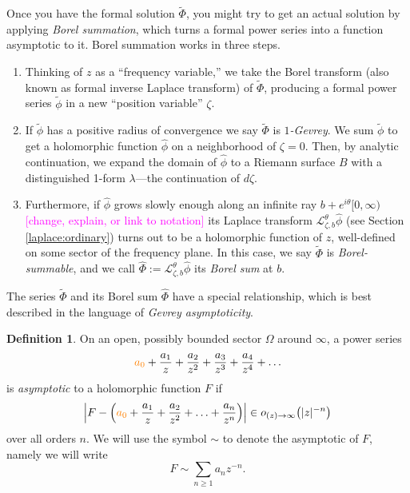 \documentclass{article}
\let\Re\relax
\DeclareMathOperator{\Re}{Re}
\newcommand{\series}[1]{\tilde{#1}}
\newcommand{\laplace}{\mathcal{L}}
\theoremstyle{definition}
\newtheorem{defn}{Definition}
\theoremstyle{plain}
\begin{document}
Once you have the formal solution $\series{\Phi}$, you might try to get an actual solution by applying {\em Borel summation}, which turns a formal power series into a function asymptotic to it. Borel summation works in three steps.
\begin{enumerate}
\item Thinking of $z$ as a ``frequency variable,'' we take the Borel transform (also known as formal inverse Laplace transform) of $\series{\Phi}$, producing a formal power series $\series{\phi}$ in a new ``position variable'' $\zeta$.
\item If $\series{\phi}$ has a positive radius of convergence we say $\series{\Phi}$ is {\em $1$-Gevrey}. We sum $\series{\phi}$ to get a holomorphic function $\hat{\phi}$ on a neighborhood of $\zeta = 0$. Then, by analytic continuation, we expand the domain of $\hat{\phi}$ to a Riemann surface $B$ with a distinguished 1-form $\lambda$---the continuation of $d\zeta$. %
\item Furthermore, if $\hat{\phi}$ grows slowly enough along an infinite ray $b + e^{i\theta}[0, \infty)$ \textcolor{magenta}{[change, explain, or link to notation]} its Laplace transform $\laplace_{\zeta,b}^\theta \hat{\phi}$ (see Section \ref{laplace:ordinary}) turns out to be a holomorphic function of $z$, well-defined on some sector of the frequency plane. In this case, we say $\tilde{\Phi}$ is {\em Borel-summable}, and we call $\hat{\Phi}:=\laplace_{\zeta,b}^\theta \hat{\phi}$ its {\em Borel sum} at $b$. 
\end{enumerate}
The series $\series{\Phi}$ and its Borel sum $\hat{\Phi}$ have a special relationship, which is best described in the language of {\em Gevrey asymptoticity}. %
\begin{defn}
On an open, possibly bounded sector $\Omega$ around $\infty$, a power series
\begin{equation}\label{series:asymp-defn}
\textcolor{orange}{a_0}+\frac{a_1}{z} + \frac{a_2}{z^2} + \frac{a_3}{z^3} + \frac{a_4}{z^4} + \ldots
\end{equation}
is {\em asymptotic} to a holomorphic function $F$ if
\[ \left|F - \left(\textcolor{orange}{a_0}+\frac{a_1}{z} + \frac{a_2}{z^2} + \ldots + \frac{a_n}{z^n} \right) \right| \in o_{\Re(z) \to \infty}\big(|z|^{-n}\big) \]
over all orders $n$. We will use the symbol $\sim$ to denote the asymptotic of $F$, namely we will write \[F\sim \sum_{n\geq 1} a_n z^{-n}.\]
\end{defn}
\end{document}
